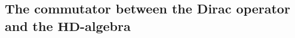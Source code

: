 \documentclass[letterpaper,12pt]{article}
\newcommand{\cF}{{\cal F}}
\begin{document}







\subsection{The commutator between the Dirac operator and the $\mathbf{HD}$-algebra }
\end{document}
